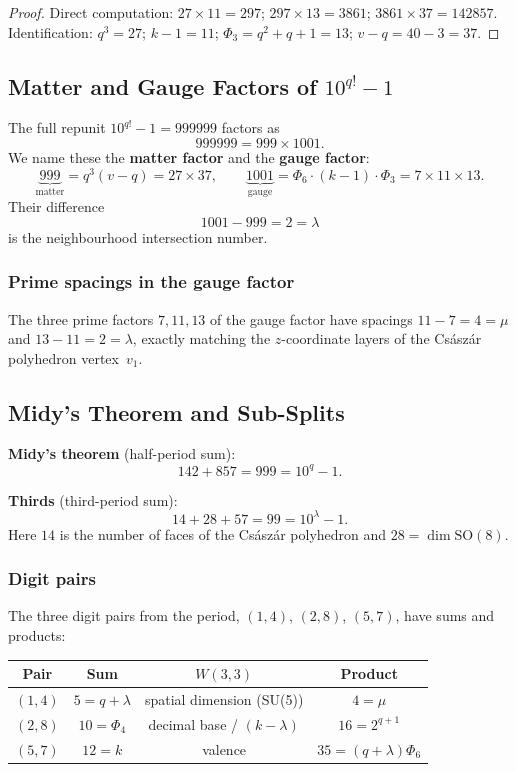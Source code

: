 \begin{proof}
Direct computation: $27 \times 11 = 297$; $297 \times 13 = 3861$; $3861 \times 37 = 142857$.
Identification: $q^3 = 27$; $k-1 = 11$; $\Phi_3 = q^2 + q + 1 = 13$; $v - q = 40 - 3 = 37$.
\end{proof}

\subsection{Matter and Gauge Factors of $10^{q!} - 1$}

The full repunit $10^{q!} - 1 = 999999$ factors as
\[
  999999 = 999 \times 1001.
\]
We name these the \textbf{matter factor} and the \textbf{gauge factor}:
\[
  \underbrace{999}_{\text{matter}} = q^3(v-q) = 27 \times 37,
  \qquad
  \underbrace{1001}_{\text{gauge}} = \Phi_6 \cdot (k-1) \cdot \Phi_3 = 7 \times 11 \times 13.
\]
Their difference
\[
  1001 - 999 = 2 = \lambda
\]
is the neighbourhood intersection number.

\subsubsection*{Prime spacings in the gauge factor}

The three prime factors $7, 11, 13$ of the gauge factor have spacings
$11 - 7 = 4 = \mu$ and $13 - 11 = 2 = \lambda$, exactly matching the
$z$-coordinate layers of the Cs\'asz\'ar polyhedron vertex~$v_1$.

\subsection{Midy's Theorem and Sub-Splits}

\textbf{Midy's theorem} (half-period sum):
\[
  142 + 857 = 999 = 10^q - 1.
\]

\textbf{Thirds} (third-period sum):
\[
  14 + 28 + 57 = 99 = 10^\lambda - 1.
\]
Here $14$ is the number of faces of the Cs\'asz\'ar polyhedron and $28 = \dim\mathrm{SO}(8)$.

\subsubsection*{Digit pairs}

The three digit pairs from the period, $(1,4)$, $(2,8)$, $(5,7)$, have sums and products:
\begin{center}
\begin{tabular}{cccc}
\hline
Pair & Sum & $W(3,3)$ & Product \\ \hline
$(1,4)$ & $5 = q+\lambda$ & spatial dimension (SU(5)) & $4 = \mu$ \\
$(2,8)$ & $10 = \Phi_4$ & decimal base / $(k-\lambda)$ & $16 = 2^{q+1}$ \\
$(5,7)$ & $12 = k$ & valence & $35 = (q+\lambda)\Phi_6$ \\
\hline
\end{tabular}
\end{center}

